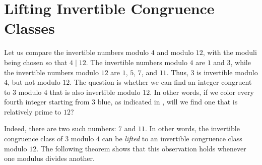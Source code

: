 

\section{Lifting Invertible Congruence Classes}

\begin{example}
  Let us compare the invertible numbers modulo $4$ and modulo $12$, with the moduli being chosen so that $4\mid12$. The invertible numbers modulo $4$ are $1$ and $3$, while the invertible numbers modulo $12$ are $1$, $5$, $7$, and $11$. Thus, $3$ is invertible modulo $4$, but not modulo $12$. The question is whether we can find an integer congruent to $3$ modulo $4$ that is also invertible modulo $12$. In other words, if we color every fourth integer starting from $3$ blue, as indicated in , will we find one that is relatively prime to $12$?

  Indeed, there are two such numbers: $7$ and $11$. In other words, the invertible congruence class of $3$ modulo $4$ can be \emph{lifted} to an invertible congruence class modulo $12$. The following theorem shows that this observation holds whenever one modulus divides another.
\end{example}

